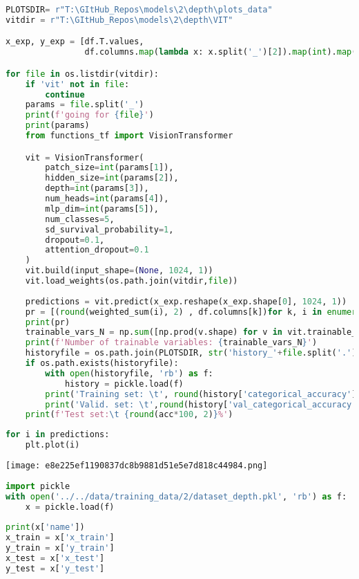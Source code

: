 \begin{lstlisting}[language=Python]
PLOTSDIR= r"T:\GItHub_Repos\models\2\depth\plots_data"
vitdir = r"T:\GItHub_Repos\models\2\depth\VIT"

x_exp, y_exp = [df.T.values,
                df.columns.map(lambda x: x.split('_')[2]).map(int).map(angstrom_to_label)]

for file in os.listdir(vitdir):
    if 'vit' not in file:
        continue
    params = file.split('_')
    print(f'going for {file}')
    print(params)
    from functions_tf import VisionTransformer

    vit = VisionTransformer(
        patch_size=int(params[1]),
        hidden_size=int(params[2]),
        depth=int(params[3]),
        num_heads=int(params[4]),
        mlp_dim=int(params[5]),
        num_classes=5,
        sd_survival_probability=1,
        dropout=0.1,
        attention_dropout=0.1
    )
    vit.build(input_shape=(None, 1024, 1))
    vit.load_weights(os.path.join(vitdir,file))
    
    predictions = vit.predict(x_exp.reshape(x_exp.shape[0], 1024, 1))
    pr = [(round(weighted_sum(i), 2) , df.columns[k])for k, i in enumerate(predictions)]
    print(pr)
    trainable_vars_N = np.sum([np.prod(v.shape) for v in vit.trainable_variables])
    print(f'Number of trainable variables: {trainable_vars_N}')
    historyfile = os.path.join(PLOTSDIR, str('history_'+file.split('.')[0][:-8]+'.pkl'))
    if os.path.exists(historyfile):
        with open(historyfile, 'rb') as f:
            history = pickle.load(f)
        print('Training set: \t', round(history['categorical_accuracy'][-1]*100, 2), '%')
        print('Valid. set: \t',round(history['val_categorical_accuracy'][-1]*100, 2), '%')
    print(f'Test set:\t {round(acc*100, 2)}%')
\end{lstlisting}

\begin{lstlisting}[language=Python]
for i in predictions:
    plt.plot(i)
\end{lstlisting}

\texttt{[image: e8e225ef1190837dc8b9881d51e5e7d818c44984.png]}

\begin{lstlisting}[language=Python]
import pickle
with open('../../data/training_data/2/dataset_depth.pkl', 'rb') as f:
    x = pickle.load(f)
    
print(x['name'])
x_train = x['x_train']
y_train = x['y_train']
x_test = x['x_test']
y_test = x['y_test']
\end{lstlisting}

